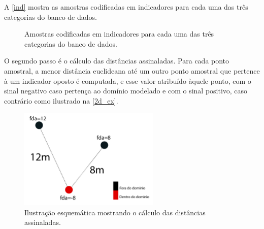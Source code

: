 A \autoref{ind} mostra as amostras codificadas em indicadores para cada uma das três categorias do banco de dados.

\begin{figure}
    \caption{Amostras codificadas em indicadores para cada uma das três categorias do banco de dados.} \label{ind}
     \centering
\end{figure}

O segundo passo é o cálculo das distâncias assinaladas. Para cada ponto amostral, a menor distância euclideana até um outro ponto amostral que pertence à um indicador oposto é computada, e esse valor atribuído àquele ponto, com o sinal negativo caso pertença ao domínio modelado e com o sinal positivo, caso contrário como ilustrado na \autoref{2d_ex}. 

\begin{figure}[!htb]
	\caption{\label{2d_ex}Ilustração esquemática mostrando o cálculo das distâncias assinaladas.}
	\begin{center}
		\includegraphics[width=0.6\textwidth]{capitulo_2/2d_ex.jpg}
	\end{center}
\end{figure}

